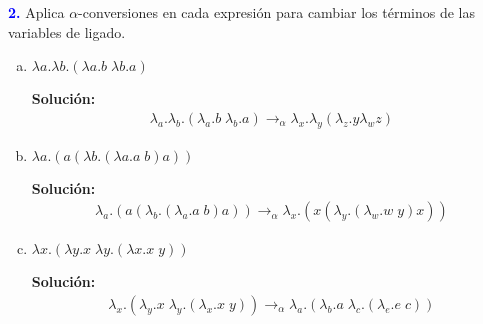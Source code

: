 \textbf{\textcolor{blue}{2.}} \Large
Aplica $\alpha$-conversiones en cada expresión
para cambiar los términos de las variables de ligado.
\begin{enumerate}[a)]
    \item $\lambda a.\lambda b.(\lambda a.b \; \lambda b.a)$
    
    \textbf{Solución:}
    \begin{eqnarray*}
        \lambda_a . \lambda_b . (\lambda_a . b \; \lambda_b . a)
        \rightarrow_{\alpha} \lambda_x . \lambda_y (\lambda_z . y \lambda_w z)
    \end{eqnarray*}
    \item $\lambda a.(a(\lambda b.(\lambda a.a\; b)a))$
    
    \textbf{Solución:}
    \begin{eqnarray*}
        \lambda_a .(a(\lambda_b .(\lambda_a .a\; b)a))
        \rightarrow_{\alpha} \lambda_x .(x(\lambda_y .(\lambda_w .w\; y)x))
    \end{eqnarray*}
    \item $\lambda x.(\lambda y.x\; \lambda y.(\lambda x.x \; y))$
    
    \textbf{Solución:}
    \begin{eqnarray*}
        \lambda_x .(\lambda_y .x\; \lambda_y .(\lambda_x .x \; y))
        \rightarrow_{\alpha} \lambda_a .(\lambda_b .a\; \lambda_c .(\lambda_e .e \; c))
    \end{eqnarray*}
\end{enumerate}
